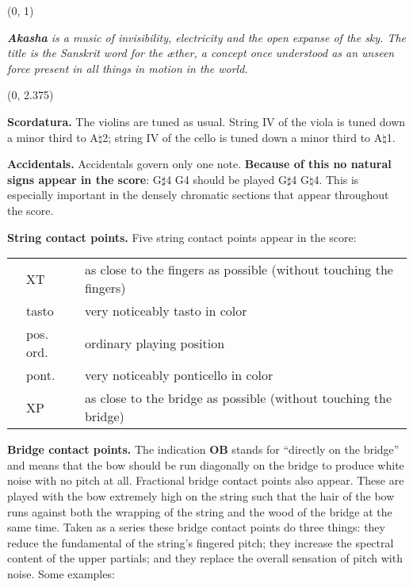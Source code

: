 \documentclass[10pt]{article}
\begin{document}

\begin{textblock}{23}(0, 1)

\textit{\textbf{Akasha} is a music of invisibility, electricity and the open expanse of
the sky. The title is the Sanskrit word for the \ae ther, a concept once
understood as an unseen force present in all things in motion in the world.}

\end{textblock}

\begin{textblock}{23}(0, 2.375)

\textbf{Scordatura.} The violins are tuned as usual. String IV of the viola is
tuned down a minor third to A$\natural$2; string IV of the cello is tuned down
a minor third to A$\natural$1.

\textbf{Accidentals.} Accidentals govern only one note. \textbf{Because of this
no natural signs appear in the score}: G$\sharp$4 G4 should be played
G$\sharp$4 G$\natural$4. This is especially important in the densely chromatic
sections that appear throughout the score.

\textbf{String contact points.} Five string contact points appear in the score:

\begin{tabu}{l l l}
\phantom{M} & XT & as close to the fingers as possible (without touching the fingers) \\
            & tasto & very noticeably tasto in color\\
            & pos. ord. & ordinary playing position \\
            & pont. & very noticeably ponticello in color \\
            & XP & as close to the bridge as possible (without touching the bridge) \\
\end{tabu}

\textbf{Bridge contact points.} The indication \textbf{OB} stands for
``directly on the bridge'' and means that the bow should be run diagonally on
the bridge to produce white noise with no pitch at all. Fractional bridge
contact points also appear. These are played with the bow extremely high on the
string such that the hair of the bow runs against both the wrapping of the
string and the wood of the bridge at the same time. Taken as a series these
bridge contact points do three things: they reduce the
fundamental of the string's fingered pitch; they increase the spectral content
of the upper partials; and they replace the overall sensation of pitch with
noise. Some examples:


\end{textblock}
\end{document}
